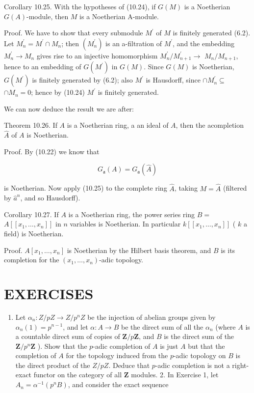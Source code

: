 \documentclass{standalone}
\theoremstyle{definition}
\theoremstyle{remark}
\begin{document}
Corollary 10.25. With the hypotheses of (10.24), if $G(M)$ is a Noetherian $G(A)$-module, then $M$ is a Noetherian A-module.

Proof. We have to show that every submodule $M^{\prime}$ of $M$ is finitely generated (6.2). Let $M_{n}^{\prime}=M^{\prime} \cap M_{n}$; then $\left(M_{n}^{\prime}\right)$ is an a-filtration of $M^{\prime}$, and the embedding $M_{n}^{\prime} \rightarrow M_{n}$ gives rise to an injective homomorphism $M_{n}^{\prime} / M_{n+1}^{\prime} \rightarrow$ $M_{n} / M_{n+1}$, hence to an embedding of $G\left(M^{\prime}\right)$ in $G(M)$. Since $G(M)$ is Noetherian, $G\left(M^{\prime}\right)$ is finitely generated by (6.2); also $M^{\prime}$ is Hausdorff, since $\cap M_{n}^{\prime} \subseteq$ $\cap M_{n}=0$; hence by (10.24) $M^{\prime}$ is finitely generated.

We can now deduce the result we are after:

Theorem 10.26. If $A$ is a Noetherian ring, a an ideal of $A$, then the acompletion $\hat{A}$ of $A$ is Noetherian.

Proof. By (10.22) we know that

\[
G_{\mathfrak{a}}(A)=G_{\mathfrak{a}}(\hat{A})
\]

is Noetherian. Now apply (10.25) to the complete ring $\hat{A}$, taking $M=\hat{A}$ (filtered by $\hat{a}^{n}$, and so Hausdorff).

Corollary 10.27. If $A$ is a Noetherian ring, the power series ring $B=$ $A\left[\left[x_{1}, \ldots, x_{n}\right]\right]$ in $n$ variables is Noetherian. In particular $k\left[\left[x_{1}, \ldots, x_{n}\right]\right]$ ( $k$ a field) is Noetherian.

Proof. $A\left[x_{1}, \ldots, x_{n}\right]$ is Noetherian by the Hilbert basis theorem, and $B$ is its completion for the $\left(x_{1}, \ldots, x_{n}\right)$-adic topology.

\section{EXERCISES}
\begin{enumerate}
  \item Let $\alpha_{n}: Z / p Z \rightarrow Z / p^{n} Z$ be the injection of abelian groups given by $\alpha_{n}(1)=p^{n-1}$, and let $\alpha: A \rightarrow B$ be the direct sum of all the $\alpha_{n}$ (where $A$ is a countable direct sum of copies of $\mathbf{Z} / p \mathbf{Z}$, and $B$ is the direct sum of the $\mathbf{Z} / p^{n} \mathbf{Z}$ ). Show that the $p$-adic completion of $A$ is just $A$ but that the completion of $A$ for the topology induced from the $p$-adic topology on $B$ is the direct product of the $Z / p Z$. Deduce that $p$-adic completion is not a right-exact functor on the category of all $\mathbf{Z}$ modules. 2. In Exercise 1, let $A_{n}=\alpha^{-1}\left(p^{n} B\right)$, and consider the exact sequence
\end{enumerate}
\end{document}

